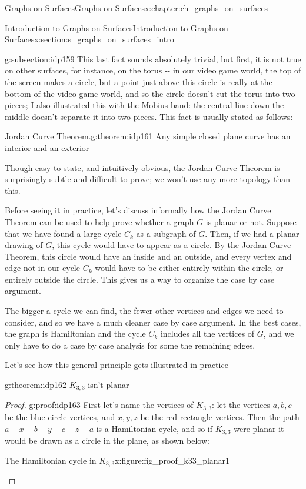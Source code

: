 \documentclass[oneside,10pt,]{book}
\numberwithin{equation}{section}
\begin{document}
\begin{chapterptx}{Graphs on Surfaces}{}{Graphs on Surfaces}{}{}{x:chapter:ch_graphs_on_surfaces}
\begin{sectionptx}{Introduction to Graphs on Surfaces}{}{Introduction to Graphs on Surfaces}{}{}{x:section:s_graphs_on_surfaces_intro}
\begin{subsectionptx}{}{}{}{}{}{g:subsection:idp159}
This last fact sounds absolutely trivial, but first, it is not true on other surfaces, for instance, on the torus -{}-{} in our video game world, the top of the screen makes a circle, but a point just above this circle is really at the bottom of the video game world, and so the circle doesn't cut the torus into two pieces; I also illustrated this with the Mobius band: the central line down the middle doesn't separate it into two pieces.  This fact is usually stated as follows:%
\begin{theorem}{Jordan Curve Theorem.}{}{g:theorem:idp161}%
Any simple closed plane curve has an interior and an exterior%
\end{theorem}
Though easy to state, and intuitively obvious, the Jordan Curve Theorem is surprisingly subtle and difficult to prove; we won't use any more topology than this.%
\par
Before seeing it in practice, let's discuss informally how the Jordan Curve Theorem can be used to help prove whether a graph \(G\) is planar or not.  Suppose that we have found a large cycle \(C_k\) as a subgraph of \(G\).  Then, if we had a planar drawing of \(G\), this cycle would have to appear as a circle.  By the Jordan Curve Theorem, this circle would have an inside and an outside, and every vertex and edge not in our cycle \(C_k\) would have to be either entirely within the circle, or entirely outside the circle.  This gives us a way to organize the case by case argument.%
\par
The bigger a cycle we can find, the fewer other vertices and edges we need to consider, and so we have a much cleaner case by case argument.  In the best cases, the graph is Hamiltonian and the cycle \(C_k\) includes all the vertices of \(G\), and we only have to do a case by case analysis for some the remaining edges.%
\par
Let's see how this general principle gets illustrated in practice%
\begin{theorem}{}{}{g:theorem:idp162}%
\(K_{3,3}\) isn't planar\end{theorem}
\begin{proof}{}{g:proof:idp163}
First let's name the vertices of \(K_{3,3}\): let the vertices \(a,b,c\) be the blue circle vertices, and \(x,y,z\) be the red rectangle vertices.  Then the path \(a-x-b-y-c-z-a\) is a Hamiltonian cycle, and so if \(K_{3,3}\) were planar it would be drawn as a circle in the plane, as shown below:%
\begin{figureptx}{The Hamiltonian cycle in \(K_{3,3}\)}{x:figure:fig_proof_k33_planar1}{}%

\end{figureptx}
\end{proof}
\end{subsectionptx}
\end{sectionptx}
\end{chapterptx}
\end{document}

